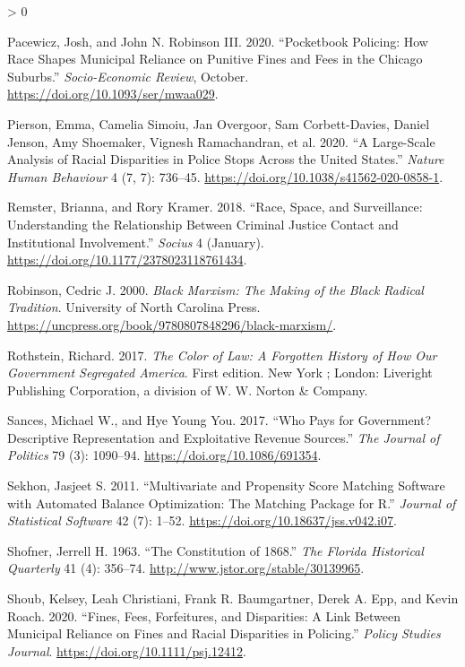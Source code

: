\documentclass[
  12pt,
]{article}
\newlength{\cslhangindent}
\newenvironment{CSLReferences}[2] %
 {%
  \setlength{\parindent}{0pt}
  \ifodd #1 \everypar{\setlength{\hangindent}{\cslhangindent}}\ignorespaces\fi
  \ifnum #2 > 0
  \setlength{\parskip}{#2\baselineskip}
  \fi
 }%
 {}
\begin{document}
\begin{CSLReferences}{1}{0}
\leavevmode\hypertarget{ref-Pacewicz2020}{}%
Pacewicz, Josh, and John N. Robinson III. 2020. {``Pocketbook Policing: {How} Race Shapes Municipal Reliance on Punitive Fines and Fees in the {Chicago} Suburbs.''} \emph{Socio-Economic Review}, October. \url{https://doi.org/10.1093/ser/mwaa029}.

\leavevmode\hypertarget{ref-Pierson2020}{}%
Pierson, Emma, Camelia Simoiu, Jan Overgoor, Sam Corbett-Davies, Daniel Jenson, Amy Shoemaker, Vignesh Ramachandran, et al. 2020. {``A Large-Scale Analysis of Racial Disparities in Police Stops Across the {United States}.''} \emph{Nature Human Behaviour} 4 (7, 7): 736--45. \url{https://doi.org/10.1038/s41562-020-0858-1}.

\leavevmode\hypertarget{ref-Remster2018a}{}%
Remster, Brianna, and Rory Kramer. 2018. {``Race, {Space}, and {Surveillance}: {Understanding} the {Relationship} Between {Criminal Justice Contact} and {Institutional Involvement}.''} \emph{Socius} 4 (January). \url{https://doi.org/10.1177/2378023118761434}.

\leavevmode\hypertarget{ref-Robinson2000}{}%
Robinson, Cedric J. 2000. \emph{Black {Marxism}: The {Making} of the {Black Radical Tradition}}. {University of North Carolina Press}. \url{https://uncpress.org/book/9780807848296/black-marxism/}.

\leavevmode\hypertarget{ref-Rothstein2017}{}%
Rothstein, Richard. 2017. \emph{The Color of Law: A Forgotten History of How Our Government Segregated {America}}. First edition. {New York ; London}: {Liveright Publishing Corporation, a division of W. W. Norton \& Company}.

\leavevmode\hypertarget{ref-Sances2017}{}%
Sances, Michael W., and Hye Young You. 2017. {``Who {Pays} for {Government}? {Descriptive Representation} and {Exploitative Revenue Sources}.''} \emph{The Journal of Politics} 79 (3): 1090--94. \url{https://doi.org/10.1086/691354}.

\leavevmode\hypertarget{ref-Sekhon2011}{}%
Sekhon, Jasjeet S. 2011. {``Multivariate and {Propensity Score Matching Software} with {Automated Balance Optimization}: {The Matching} Package for {R}.''} \emph{Journal of Statistical Software} 42 (7): 1--52. \url{https://doi.org/10.18637/jss.v042.i07}.

\leavevmode\hypertarget{ref-Shofner1963}{}%
Shofner, Jerrell H. 1963. {``The {Constitution} of 1868.''} \emph{The Florida Historical Quarterly} 41 (4): 356--74. \url{http://www.jstor.org/stable/30139965}.

\leavevmode\hypertarget{ref-Shoub2020}{}%
Shoub, Kelsey, Leah Christiani, Frank R. Baumgartner, Derek A. Epp, and Kevin Roach. 2020. {``Fines, {Fees}, {Forfeitures}, and {Disparities}: {A Link Between Municipal Reliance} on {Fines} and {Racial Disparities} in {Policing}.''} \emph{Policy Studies Journal}. \url{https://doi.org/10.1111/psj.12412}.


\end{CSLReferences}
\end{document}
